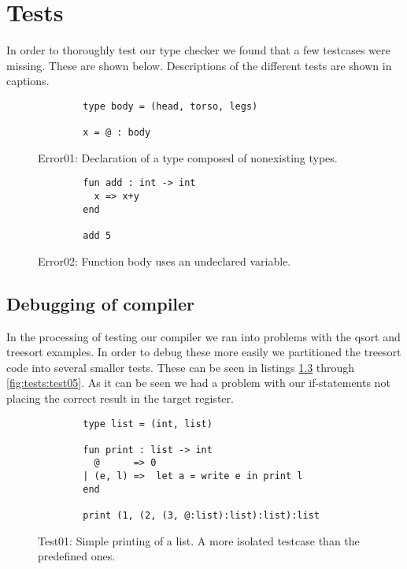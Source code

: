 \chapter{Tests}
In order to thoroughly test our type checker we found that a few testcases
were missing. These are shown below. Descriptions of the different tests are
shown in captions.

\begin{figure}
    \centering
    \begin{lstlisting}
        type body = (head, torso, legs)

        x = @ : body
    \end{lstlisting}
    \label{fig:tests:error01}
    \caption{Error01: Declaration of a type composed of nonexisting types.}
\end{figure}

\begin{figure}
    \centering
    \begin{lstlisting}
        fun add : int -> int
          x => x+y
        end

        add 5
    \end{lstlisting}
    \label{fig:tests:error02}
    \caption{Error02: Function body uses an undeclared variable.}
\end{figure}


\section{Debugging of compiler}
In the processing of testing our compiler we ran into problems with the qsort
and treesort examples. In order to debug these more easily we partitioned the
treesort code into several smaller tests. These can be seen in listings
\ref{fig:tests:test01} through \ref{fig:tests:test05}. As it can be seen we
had a problem with our if-statements not placing the correct result in the
target register.

\begin{figure}
    \centering
    \begin{lstlisting}
        type list = (int, list)

        fun print : list -> int
          @      => 0
        | (e, l) =>  let a = write e in print l
        end

        print (1, (2, (3, @:list):list):list):list
    \end{lstlisting}
    \label{fig:tests:test01}
    \caption{Test01: Simple printing of a list. A more isolated testcase than
             the predefined ones.}
\end{figure}

